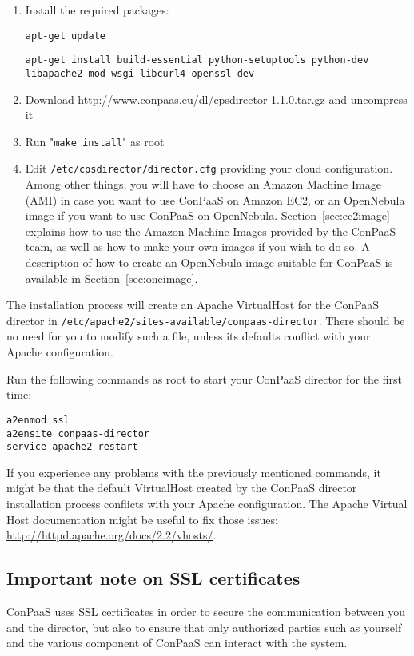 \documentclass[10pt]{article}
\begin{document}
\begin{enumerate}
\item Install the required packages: 

\texttt{apt-get update}

\texttt{apt-get install build-essential python-setuptools python-dev libapache2-mod-wsgi libcurl4-openssl-dev}
\item Download \url{http://www.conpaas.eu/dl/cpsdirector-1.1.0.tar.gz} and uncompress it
\item Run "\texttt{make install}" as root
\item Edit \texttt{/etc/cpsdirector/director.cfg} providing your cloud
 configuration. Among other things, you will have to choose an Amazon Machine
 Image (AMI) in case you want to use ConPaaS on Amazon EC2, or an OpenNebula
 image if you want to use ConPaaS on OpenNebula. Section~\ref{sec:ec2image}
 explains how to use the Amazon Machine Images provided by the ConPaaS team, as
 well as how to make your own images if you wish to do so. A description of how
 to create an OpenNebula image suitable for ConPaaS is available in
 Section~\ref{sec:oneimage}.
\end{enumerate}

The installation process will create an Apache VirtualHost for the ConPaaS
director in \texttt{/etc/apache2/sites-available/conpaas-director}. There should
be no need for you to modify such a file, unless its defaults conflict with your
Apache configuration.

Run the following commands as root to start your ConPaaS director for the first
time:

\begin{verbatim}
a2enmod ssl
a2ensite conpaas-director
service apache2 restart
\end{verbatim}

If you experience any problems with the previously mentioned commands, it might
be that the default VirtualHost created by the ConPaaS director installation
process conflicts with your Apache configuration. The Apache Virtual Host
documentation might be useful to fix those issues:
\url{http://httpd.apache.org/docs/2.2/vhosts/}.

\subsection{Important note on SSL certificates}
ConPaaS uses SSL certificates in order to secure the communication between you
and the director, but also to ensure that only authorized parties such as
yourself and the various component of ConPaaS can interact with the system.
\end{document}
